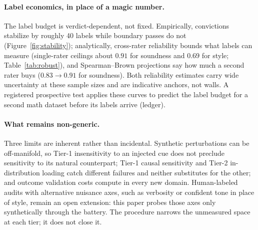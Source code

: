 \paragraph{Label economics, in place of a magic number.}
The label budget is verdict-dependent, not fixed.
Empirically, convictions stabilize by roughly 40 labels while boundary passes do not (Figure~\ref{fig:stability}); analytically, cross-rater reliability bounds what labels can measure (single-rater ceilings about $0.91$ for soundness and $0.69$ for style; Table~\ref{tab:robust}), and Spearman--Brown projections say how much a second rater buys ($0.83 \to 0.91$ for soundness).
Both reliability estimates carry wide uncertainty at these sample sizes and are indicative anchors, not walls.
A registered prospective test applies these curves to predict the label budget for a second math dataset before its labels arrive (ledger).

\paragraph{What remains non-generic.}
Three limits are inherent rather than incidental.
Synthetic perturbations can be off-manifold, so Tier-1 insensitivity to an injected cue does not preclude sensitivity to its natural counterpart; Tier-1 causal sensitivity and Tier-2 in-distribution loading catch different failures and neither substitutes for the other; and outcome validation costs compute in every new domain.
Human-labeled audits with alternative nuisance axes, such as verbosity or confident tone in place of style, remain an open extension: this paper probes those axes only synthetically through the battery.
The procedure narrows the unmeasured space at each tier; it does not close it.
